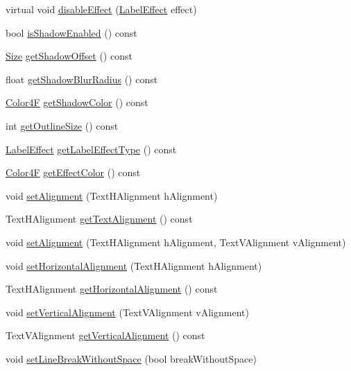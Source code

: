 \begin{DoxyCompactItemize}
\item 
virtual void \hyperlink{classLabel_a109588481f85c8cdd378d7adbb23edbe}{disable\+Effect} (\hyperlink{group__base_ga26fd049ca5303e0cf4435208058f32e4}{Label\+Effect} effect)
\item 
bool \hyperlink{classLabel_ada5f28d2fbfcb18862890be2b36fd1d8}{is\+Shadow\+Enabled} () const
\item 
\hyperlink{classSize}{Size} \hyperlink{classLabel_a46496ccac5e3a936cb0008db68a0e91e}{get\+Shadow\+Offset} () const
\item 
float \hyperlink{classLabel_a6d187422565a9368e03e1f71e39efbd3}{get\+Shadow\+Blur\+Radius} () const
\item 
\hyperlink{structColor4F}{Color4F} \hyperlink{classLabel_a5a17b13a523cd53169bf248cfd45c776}{get\+Shadow\+Color} () const
\item 
int \hyperlink{classLabel_a21b42e1e698b718c6d90b61b7794de43}{get\+Outline\+Size} () const
\item 
\hyperlink{group__base_ga26fd049ca5303e0cf4435208058f32e4}{Label\+Effect} \hyperlink{classLabel_a36187b9d07b216314adb4d4f2fad34d2}{get\+Label\+Effect\+Type} () const
\item 
\hyperlink{structColor4F}{Color4F} \hyperlink{classLabel_abd570f8a274713151c9a48d2b538a625}{get\+Effect\+Color} () const
\item 
void \hyperlink{classLabel_a2dd709f7a812d19d666b3b063534d34b}{set\+Alignment} (Text\+H\+Alignment h\+Alignment)
\item 
Text\+H\+Alignment \hyperlink{classLabel_aa23acedf74e98f051f47e76c3b1a088c}{get\+Text\+Alignment} () const
\item 
void \hyperlink{classLabel_a3fb693a7db81e6b313a2c9c871f8cf63}{set\+Alignment} (Text\+H\+Alignment h\+Alignment, Text\+V\+Alignment v\+Alignment)
\item 
void \hyperlink{classLabel_a53f1b4d0796e3e538f7e40f1f5badbb1}{set\+Horizontal\+Alignment} (Text\+H\+Alignment h\+Alignment)
\item 
Text\+H\+Alignment \hyperlink{classLabel_ae7bcc1f4a628d8d3ab354d80b97cf3e1}{get\+Horizontal\+Alignment} () const
\item 
void \hyperlink{classLabel_a97b358d0917e0a70b16146ec3a105d42}{set\+Vertical\+Alignment} (Text\+V\+Alignment v\+Alignment)
\item 
Text\+V\+Alignment \hyperlink{classLabel_ab3981bcbc2730ddda1cbb68a0faf20ac}{get\+Vertical\+Alignment} () const
\item 
void \hyperlink{classLabel_aa6ea9a4b8d81b4c14e44fdd3a862073f}{set\+Line\+Break\+Without\+Space} (bool break\+Without\+Space)

\end{DoxyCompactItemize}

